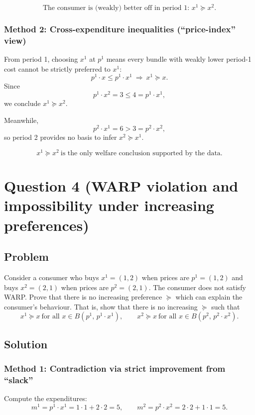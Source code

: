 \documentclass[12pt]{article}
\begin{document}
\[
\boxed{\text{The consumer is (weakly) better off in period 1: } x^{1}\succeq x^{2}.}
\]

\subsubsection*{Method 2: Cross-expenditure inequalities (``price-index'' view)}
From period 1, choosing \(x^1\) at \(p^1\) means every bundle with weakly lower period-1 cost cannot be strictly preferred to \(x^1\):
\[
p^1\cdot x \le p^1\cdot x^1 \ \Longrightarrow\ x^1\succeq x.
\]
Since
\[
p^1\cdot x^2 = 3 \le 4 = p^1\cdot x^1,
\]
we conclude \(x^1\succeq x^2\).

Meanwhile,
\[
p^2\cdot x^1 = 6 > 3 = p^2\cdot x^2,
\]
so period 2 provides no basis to infer \(x^2\succeq x^1\).

\[
\boxed{x^1 \succeq x^2\ \text{is the only welfare conclusion supported by the data.}}
\]

\newpage
\section*{Question 4 (WARP violation and impossibility under increasing preferences)}
\subsection*{Problem}
Consider a consumer who buys \(x^{1}=(1,2)\) when prices are \(p^{1}=(1,2)\) and buys \(x^{2}=(2,1)\) when prices are \(p^{2}=(2,1)\).
The consumer does not satisfy WARP.
Prove that there is no increasing preference \(\succeq\) which can explain the consumer's behaviour.
That is, show that there is no increasing \(\succeq\) such that
\[
x^{1}\succeq x \ \text{for all } x\in B(p^{1},\,p^{1}\cdot x^{1}),
\qquad
x^{2}\succeq x \ \text{for all } x\in B(p^{2},\,p^{2}\cdot x^{2}).
\]

\subsection*{Solution}

\subsubsection*{Method 1: Contradiction via strict improvement from ``slack''}
Compute the expenditures:
\[
m^1=p^{1}\cdot x^{1} = 1\cdot 1 + 2\cdot 2 = 5,
\qquad
m^2=p^{2}\cdot x^{2} = 2\cdot 2 + 1\cdot 1 = 5.
\]
\end{document}
